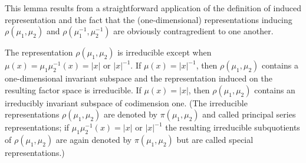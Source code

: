 This lemma results from a straightforward application of the definition of induced representation and the fact that the (one-dimensional) representations inducing $\rho(\mu_1, \mu_2)$ and $\rho(\mu_1^{-1}, \mu_2^{-1})$ are obviously contragredient to one another.

\begin{theorem}\label{thm:4.18}

The representation $\rho(\mu_1, \mu_2)$ is irreducible except when $\mu(x) = \mu_1\mu_2^{-1}(x) = |x|$ or $|x|^{-1}$. If $\mu(x) = |x|^{-1}$, then $\rho(\mu_1, \mu_2)$ contains a one-dimensional invariant subspace and the representation induced on the resulting factor space is irreducible. If $\mu(x) = |x|$, then $\rho(\mu_1, \mu_2)$ contains an irreducibly invariant subspace of codimension one. (The irreducible representations $\rho(\mu_1, \mu_2)$ are denoted by $\pi(\mu_1, \mu_2)$ and called principal series representations; if $\mu_1\mu_2^{-1}(x) = |x|$ or $|x|^{-1}$ the resulting irreducible subquotients of $\rho(\mu_1, \mu_2)$ are again denoted by $\pi(\mu_1, \mu_2)$ but are called special representations.)

\end{theorem}


